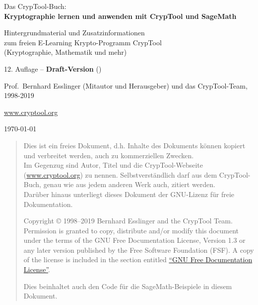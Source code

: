 {\centering
\strut\vfill
{\fontsize{25pt}{25pt}\selectfont Das CrypTool-Buch:}\\[\baselineskip]
\fontsize{35pt}{45pt}\selectfont
\textbf{
Kryptographie lernen und anwenden
                mit CrypTool und SageMath}

\bigskip

\fontsize{20pt}{25pt}\selectfont
{Hintergrundmaterial und Zusatzinformationen\\
	 zum freien E-Learning Krypto-Programm CrypTool\\
	 (Kryptographie, Mathematik und mehr)}

\vfill

 {\large 12. Auflage --  {\bf Draft-Version}
(\currenttime)}

\vfill

\fontsize{20pt}{25pt}\selectfont
Prof.\ Bernhard Esslinger (Mitautor und Herausgeber)
	und das CrypTool-Team, 1998-2019

\large
	\url{www.cryptool.org}

	\today

\vfill
}%

\newpage
%

\begin{quote}
Dies ist ein freies Dokument, d.h. Inhalte des Dokuments können kopiert und
verbreitet werden, auch zu kommerziellen Zwecken.\\
Im Gegenzug sind Autor, Titel und die CrypTool-Webseite (\url{www.cryptool.org}) zu
nennen. Selbstverständlich darf aus dem CrypTool-Buch, genau wie aus jedem
anderen Werk auch, zitiert werden. \\
Darüber hinaus unterliegt dieses Dokument der GNU-Lizenz für freie
Dokumentation.

    Copyright \copyright{} 1998--2019 Bernhard Esslinger and the
    CrypTool Team. Permission is granted to copy,
    distribute and/or modify this document under the terms of the GNU
    Free Documentation License, Version 1.3 or any later version
    published by the Free Software Foundation (FSF). A copy of
    the license is included in the section entitled
    \hyperlink{appendix-GNU-fdl}{``GNU Free Documentation License''}.

    Dies beinhaltet auch den Code für die SageMath-Beispiele in diesem Dokument.
\end{quote}




